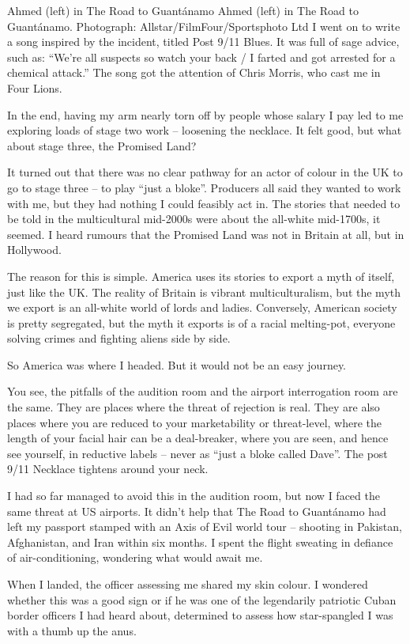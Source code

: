 \documentclass[10pt,a4paper]{article}
\begin{document}
Ahmed (left) in The Road to Guantánamo
Ahmed (left) in The Road to Guantánamo. Photograph: Allstar/FilmFour/Sportsphoto Ltd
I went on to write a song inspired by the incident, titled Post 9/11 Blues. It was full of sage advice, such as: “We’re all suspects so watch your back / I farted and got arrested for a chemical attack.” The song got the attention of Chris Morris, who cast me in Four Lions.

In the end, having my arm nearly torn off by people whose salary I pay led to me exploring loads of stage two work – loosening the necklace. It felt good, but what about stage three, the Promised Land?

It turned out that there was no clear pathway for an actor of colour in the UK to go to stage three – to play “just a bloke”. Producers all said they wanted to work with me, but they had nothing I could feasibly act in. The stories that needed to be told in the multicultural mid-2000s were about the all-white mid-1700s, it seemed. I heard rumours that the Promised Land was not in Britain at all, but in Hollywood.

The reason for this is simple. America uses its stories to export a myth of itself, just like the UK. The reality of Britain is vibrant multiculturalism, but the myth we export is an all-white world of lords and ladies. Conversely, American society is pretty segregated, but the myth it exports is of a racial melting-pot, everyone solving crimes and fighting aliens side by side.

So America was where I headed. But it would not be an easy journey.

You see, the pitfalls of the audition room and the airport interrogation room are the same. They are places where the threat of rejection is real. They are also places where you are reduced to your marketability or threat-level, where the length of your facial hair can be a deal-breaker, where you are seen, and hence see yourself, in reductive labels – never as “just a bloke called Dave”. The post 9/11 Necklace tightens around your neck.

I had so far managed to avoid this in the audition room, but now I faced the same threat at US airports. It didn’t help that The Road to Guantánamo had left my passport stamped with an Axis of Evil world tour – shooting in Pakistan, Afghanistan, and Iran within six months. I spent the flight sweating in defiance of air-conditioning, wondering what would await me.

When I landed, the officer assessing me shared my skin colour. I wondered whether this was a good sign or if he was one of the legendarily patriotic Cuban border officers I had heard about, determined to assess how star-spangled I was with a thumb up the anus.
\end{document}
